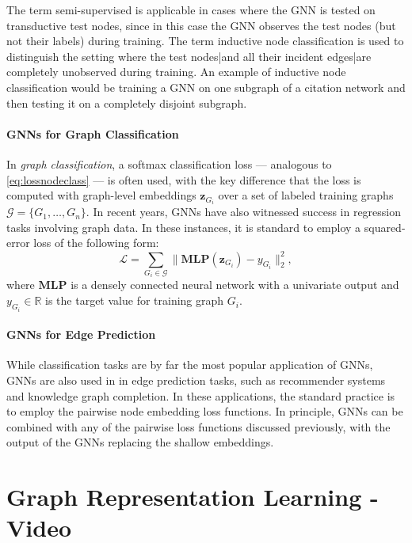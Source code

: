 \documentclass[10pt]{book}
\let\defaultmarginpar\marginpar
\renewcommand\marginpar[2][]{\defaultmarginpar{\itshape\color{gray}#2}}
\begin{document}
The term semi-supervised is applicable in cases where the GNN is tested on transductive test nodes, since in this case the GNN observes the test nodes (but not their labels) during training. The term inductive node classification is used to distinguish the setting where the test nodes|and all their incident edges|are completely unobserved during training. An example of inductive node classification would be training a GNN on one subgraph of a citation network and then testing it on a completely disjoint subgraph.

\subsubsection{GNNs for Graph Classification}

In \emph{graph classification}\marginpar{graph classification}, a softmax classification loss --- analogous to \autoref{eq:lossnodeclass} --- is often used, with the key difference that the loss is computed with graph-level embeddings $\mathbf z_{G_i}$ over a set of labeled training graphs $\mathcal G = \{G_1, \ldots, G_n\}$. In recent years, GNNs have also witnessed success in regression tasks involving graph data. In these instances, it is standard to employ a squared-error loss of the following form:
\begin{equation}
    \mathcal L = \sum_{G_i \in \mathcal G} \| \textbf{MLP}(\mathbf z_{G_i}) - y_{G_i}\|_2^2,
\end{equation}
where $\textbf{MLP}$ is a densely connected neural network with a univariate output and $y_{G_i} \in \mathbb R$ is the target value for training graph $G_i$.

\subsubsection{GNNs for Edge Prediction}

While classification tasks are by far the most popular application of GNNs, GNNs are also used in in edge prediction tasks, such as recommender systems and knowledge graph completion. In these applications, the standard practice is to employ the pairwise node embedding loss functions. In principle, GNNs can be combined with any of the pairwise loss functions discussed previously, with the output of the GNNs replacing the shallow embeddings.




\chapter{Graph Representation Learning - Video}
\end{document}
